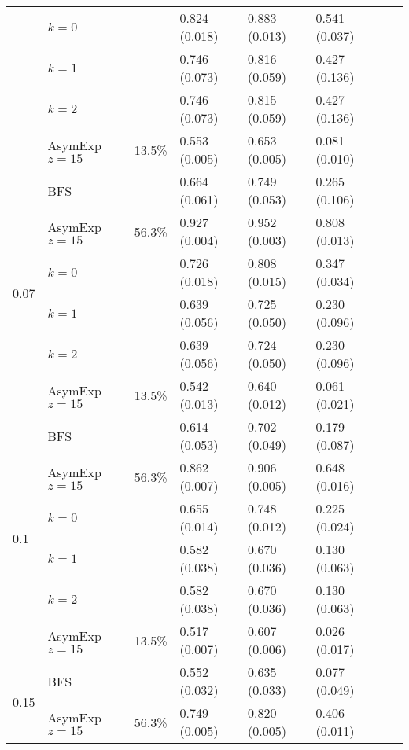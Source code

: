 \documentclass[a4paper,final,notitlepage,11pt,svgnames]{scrartcl}
\begin{document}
\begin{table}[htpb]
\begin{tabular}{llllllll}
		& $k=0$          &              & 0.824 (0.018) & 0.883 (0.013) & 0.541 (0.037)  &               & \\
		& $k=1$          &              & 0.746 (0.073) & 0.816 (0.059) & 0.427 (0.136)  &               & \\
		& $k=2$          &              & 0.746 (0.073) & 0.815 (0.059) & 0.427 (0.136)  &               & \\
		& AsymExp $z=15$ & 13.5\%       & 0.553 (0.005) & 0.653 (0.005) & 0.081 (0.010)  &               & \\
		\cmidrule(r){2-6}
		\multirow{6}{*}{0.07}     & BFS            &              & 0.664 (0.061) & 0.749 (0.053) & 0.265 (0.106)  &               & \\
		& AsymExp $z=15$ & 56.3\%       & 0.927 (0.004) & 0.952 (0.003) & 0.808 (0.013)  &               & \\
		& $k=0$          &              & 0.726 (0.018) & 0.808 (0.015) & 0.347 (0.034)  &               & \\
		& $k=1$          &              & 0.639 (0.056) & 0.725 (0.050) & 0.230 (0.096)  &               & \\
		& $k=2$          &              & 0.639 (0.056) & 0.724 (0.050) & 0.230 (0.096)  &               & \\
		& AsymExp $z=15$ & 13.5\%       & 0.542 (0.013) & 0.640 (0.012) & 0.061 (0.021)  &               & \\
		\cmidrule(r){2-6}
		\multirow{6}{*}{0.1}      & BFS            &              & 0.614 (0.053) & 0.702 (0.049) & 0.179 (0.087)  &               & \\
		& AsymExp $z=15$ & 56.3\%       & 0.862 (0.007) & 0.906 (0.005) & 0.648 (0.016)  &               & \\
		& $k=0$          &              & 0.655 (0.014) & 0.748 (0.012) & 0.225 (0.024)  &               & \\
		& $k=1$          &              & 0.582 (0.038) & 0.670 (0.036) & 0.130 (0.063)  &               & \\
		& $k=2$          &              & 0.582 (0.038) & 0.670 (0.036) & 0.130 (0.063)  &               & \\
		& AsymExp $z=15$ & 13.5\%       & 0.517 (0.007) & 0.607 (0.006) & 0.026 (0.017)  &               & \\
		\cmidrule(r){2-6}
		\multirow{6}{*}{0.15}     & BFS            &              & 0.552 (0.032) & 0.635 (0.033) & 0.077 (0.049)  &               & \\
		& AsymExp $z=15$ & 56.3\%       & 0.749 (0.005) & 0.820 (0.005) & 0.406 (0.011)  &               & \\

\end{tabular}
\end{table}
\end{document}
